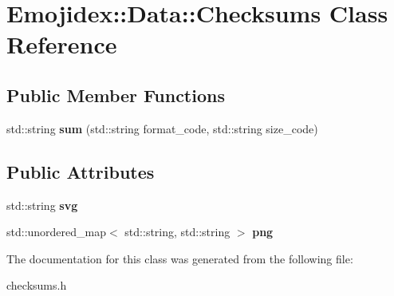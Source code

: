 \hypertarget{classEmojidex_1_1Data_1_1Checksums}{}\section{Emojidex\+:\+:Data\+:\+:Checksums Class Reference}
\label{classEmojidex_1_1Data_1_1Checksums}
\subsection*{Public Member Functions}
\begin{DoxyCompactItemize}
\item 
std\+::string {\bfseries sum} (std\+::string format\+\_\+code, std\+::string size\+\_\+code)\hypertarget{classEmojidex_1_1Data_1_1Checksums_ae8a65b3fc9c2d9fb40650c09fbbb8eca}{}\label{classEmojidex_1_1Data_1_1Checksums_ae8a65b3fc9c2d9fb40650c09fbbb8eca}

\end{DoxyCompactItemize}
\subsection*{Public Attributes}
\begin{DoxyCompactItemize}
\item 
std\+::string {\bfseries svg}\hypertarget{classEmojidex_1_1Data_1_1Checksums_a2efd7301a746504a9227cb940a66493f}{}\label{classEmojidex_1_1Data_1_1Checksums_a2efd7301a746504a9227cb940a66493f}

\item 
std\+::unordered\+\_\+map$<$ std\+::string, std\+::string $>$ {\bfseries png}\hypertarget{classEmojidex_1_1Data_1_1Checksums_a3caf0bf70d315f74fb027e1f4b880500}{}\label{classEmojidex_1_1Data_1_1Checksums_a3caf0bf70d315f74fb027e1f4b880500}

\end{DoxyCompactItemize}


The documentation for this class was generated from the following file\+:\begin{DoxyCompactItemize}
\item 
checksums.\+h\end{DoxyCompactItemize}
